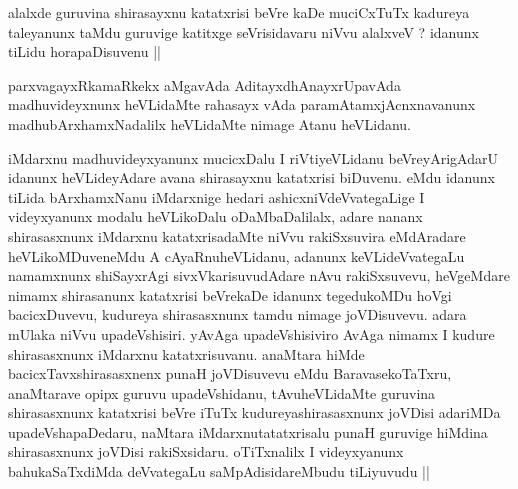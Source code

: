 \begin{artha}
alalxde guruvina shirasayxnu katatxrisi beVre kaDe muciCxTuTx kadureya taleyanunx taMdu guruvige katitxge seVrisidavaru niVvu alalxveV ? idanunx tiLidu horapaDisuvenu ||
\end{artha}

\begin{artha}
parxvagayxRkamaRkekx aMgavAda AditayxdhAnayxrUpavAda madhuvideyxnunx heVLidaMte rahasayx vAda paramAtamxjAcnxnavanunx madhubArxhamxNadalilx heVLidaMte nimage Atanu heVLidanu.
\end{artha}

\begin{center}
\end{center}

\begin{artha}
iMdarxnu madhuvideyxyanunx mucicxDalu I riVtiyeVLidanu beVreyArigAdarU idanunx heVLideyAdare avana shirasayxnu katatxrisi biDuvenu. eMdu idanunx tiLida bArxhamxNanu iMdarxnige hedari ashicxniVdeVvategaLige I videyxyanunx modalu heVLikoDalu oDaMbaDalilalx, adare nananx shirasasxnunx iMdarxnu katatxrisadaMte niVvu rakiSxsuvira eMdAradare heVLikoMDuveneMdu A cAyaRnuheVLidanu, adanunx keVLideVvategaLu namamxnunx shiSayxrAgi sivxVkarisuvudAdare nAvu rakiSxsuvevu, heVgeMdare nimamx shirasanunx katatxrisi beVrekaDe idanunx tegedukoMDu hoVgi bacicxDuvevu, kudureya shirasasxnunx tamdu nimage joVDisuvevu. adara mUlaka niVvu upadeVshisiri. yAvAga upadeVshisiviro AvAga nimamx I kudure shirasasxnunx iMdarxnu katatxrisuvanu. anaMtara hiMde bacicxTavxshirasasxnenx punaH joVDisuvevu eMdu BaravasekoTaTxru, anaMtarave opipx guruvu upadeVshidanu, tAvuheVLidaMte guruvina shirasasxnunx katatxrisi beVre iTuTx kudureyashirasasxnunx joVDisi adariMDa upadeVshapaDedaru, naMtara iMdarxnutatatxrisalu punaH guruvige  hiMdina shirasasxnunx joVDisi rakiSxsidaru. oTiTxnalilx I videyxyanunx bahukaSaTxdiMda deVvategaLu saMpAdisidareMbudu tiLiyuvudu ||
\end{artha}

